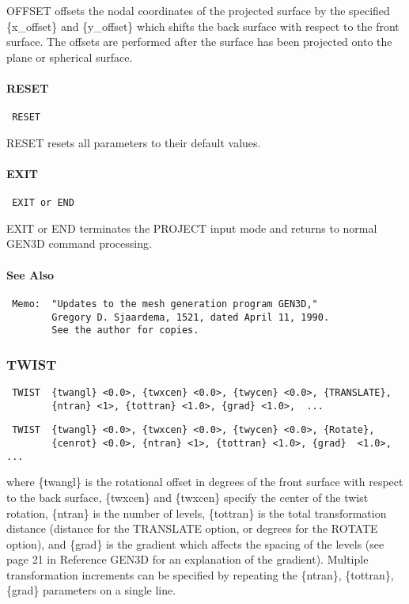 OFFSET offsets the nodal coordinates of the projected surface by the
specified \{x\_offset\} and \{y\_offset\} which shifts the back surface with
respect to the front surface.  The offsets are performed after the
surface has been projected onto the plane or spherical surface.
\paragraph{RESET}
\begin{verbatim}
 RESET
\end{verbatim}

RESET resets all parameters to their default values.
\paragraph{EXIT}
\begin{verbatim}
 EXIT or END
\end{verbatim}

EXIT or END terminates the PROJECT input mode and returns to normal GEN3D
command processing.
\paragraph{See Also}
\begin{verbatim}
 Memo:  "Updates to the mesh generation program GEN3D,"
        Gregory D. Sjaardema, 1521, dated April 11, 1990.
        See the author for copies.
\end{verbatim}
\subsubsection{TWIST}
\begin{verbatim}
 TWIST  {twangl} <0.0>, {twxcen} <0.0>, {twycen} <0.0>, {TRANSLATE},
        {ntran} <1>, {tottran} <1.0>, {grad} <1.0>,  ...
\end{verbatim}

\begin{verbatim}
 TWIST  {twangl} <0.0>, {twxcen} <0.0>, {twycen} <0.0>, {Rotate},
        {cenrot} <0.0>, {ntran} <1>, {tottran} <1.0>, {grad}  <1.0>,  ...
\end{verbatim}

where \{twangl\} is the rotational offset in degrees of the front surface
with respect to the back surface, \{twxcen\} and \{twxcen\} specify the
center of the twist rotation, \{ntran\} is the number of levels, \{tottran\}
is the total transformation distance (distance for the TRANSLATE option,
or degrees for the ROTATE option), and \{grad\} is the gradient which
affects the spacing of the levels (see page 21 in Reference GEN3D
for an explanation of the gradient).  Multiple transformation increments
can be specified by repeating the \{ntran\}, \{tottran\}, \{grad\} parameters
on a single line.

